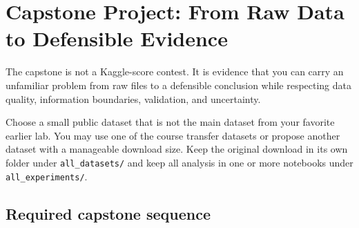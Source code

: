 \chapter*{Capstone Project: From Raw Data to Defensible Evidence}
{}

The capstone is not a Kaggle-score contest. It is evidence that you can carry an unfamiliar problem from raw files to a defensible conclusion while respecting data quality, information boundaries, validation, and uncertainty.

\begin{coursechoice}
Choose a small public dataset that is not the main dataset from your favorite earlier lab. You may use one of the course transfer datasets or propose another dataset with a manageable download size. Keep the original download in its own folder under \texttt{all\_datasets/} and keep all analysis in one or more notebooks under \texttt{all\_experiments/}.
\end{coursechoice}

\section*{Required capstone sequence}

